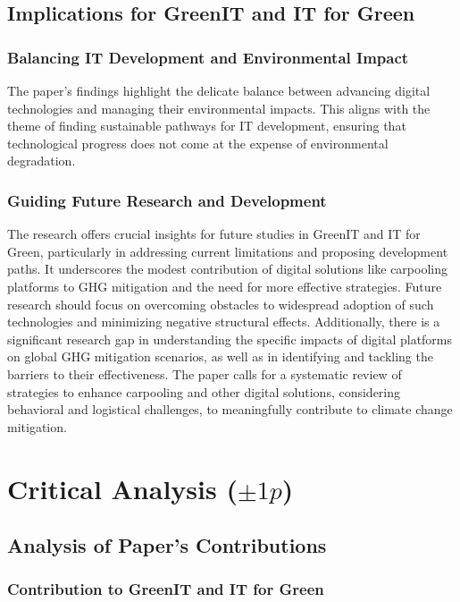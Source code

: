 \documentclass[conference,compsoc]{IEEEtran}
\begin{document}
\subsection{Implications for GreenIT and IT for Green}

\subsubsection{Balancing IT Development and Environmental Impact}

The paper's findings highlight the delicate balance between advancing digital technologies and managing their environmental impacts. This aligns with the  theme of finding sustainable pathways for IT development, ensuring that technological progress does not come at the expense of environmental degradation.

\subsubsection{Guiding Future Research and Development}

The research offers crucial insights for future studies in GreenIT and IT for Green, particularly in addressing current limitations and proposing development paths. It underscores the modest contribution of digital solutions like carpooling platforms to GHG mitigation and the need for more effective strategies. Future research should focus on overcoming obstacles to widespread adoption of such technologies and minimizing negative structural effects. Additionally, there is a significant research gap in understanding the specific impacts of digital platforms on global GHG mitigation scenarios, as well as in identifying and tackling the barriers to their effectiveness. The paper calls for a systematic review of strategies to enhance carpooling and other digital solutions, considering behavioral and logistical challenges, to meaningfully contribute to climate change mitigation.

\section{Critical Analysis ($\pm 1p$)}

\subsection{Analysis of Paper's Contributions}

\subsubsection{Contribution to GreenIT and IT for Green}
\end{document}
